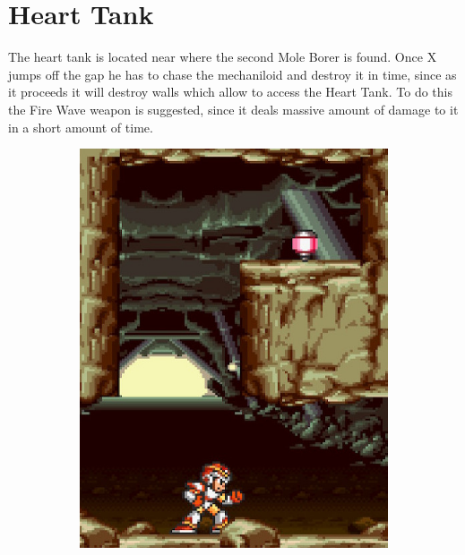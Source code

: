 \section{Heart Tank}
The heart tank is located near where the second Mole Borer is found. Once  X jumps off the gap he has to chase the mechaniloid and destroy it in time, since as it proceeds it will destroy walls which allow to access the Heart Tank. To do this the Fire Wave weapon is suggested, since it deals massive amount of damage to it in a short amount of time. 
\begin{figure}[htp]
	\centering
	\begin{subfigure}{0.3\linewidth}
		\centering
		\includegraphics[width=\linewidth]{figures/X1/Armored_armadillo/Armadillo_heart.jpg}
		\caption{}
	\end{subfigure}
	\begin{subfigure}{0.3\textwidth}
		\centering

\end{subfigure}
\end{figure}
